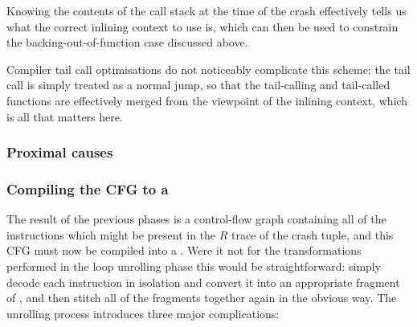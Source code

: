 Knowing the contents of the call stack at the time of the crash
effectively tells us what the correct inlining context to use is,
which can then be used to constrain the backing-out-of-function case
discussed above.

Compiler tail call optimisations do not noticeably complicate this
scheme: the tail call is simply treated as a normal jump, so that the
tail-calling and tail-called functions are effectively merged from the
viewpoint of the inlining context, which is all that matters here.

\subsubsection{Proximal causes}

\subsubsection{Compiling the CFG to a \StateMachine}


The result of the previous phases is a control-flow graph containing
all of the instructions which might be present in the $R$ trace of the
crash tuple, and this CFG must now be compiled into a \StateMachine.
Were it not for the transformations performed in the loop unrolling
phase this would be straightforward: simply decode each instruction in
isolation and convert it into an appropriate fragment of
\StateMachine, and then stitch all of the fragments together again in
the obvious way.  The unrolling process introduces three major
complications:

